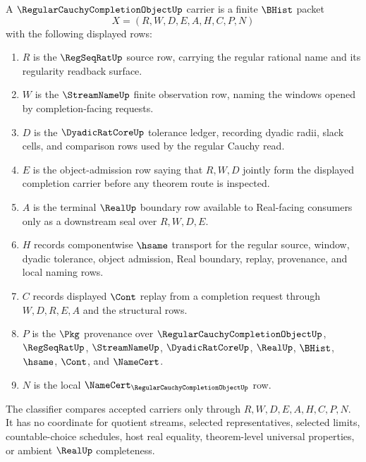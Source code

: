 \begin{definition}
\label{def:regular-cauchy-completion-object-carrier}
A $\RegularCauchyCompletionObjectUp$ carrier is a finite $\BHist$ packet
$$
X=(R,W,D,E,A,H,C,P,N)
$$
with the following displayed rows:
\begin{enumerate}
\item $R$ is the $\RegSeqRatUp$ source row, carrying the regular rational name and its regularity readback surface.
\item $W$ is the $\StreamNameUp$ finite observation row, naming the windows opened by completion-facing requests.
\item $D$ is the $\DyadicRatCoreUp$ tolerance ledger, recording dyadic radii, slack cells, and comparison rows used by the regular Cauchy read.
\item $E$ is the object-admission row saying that $R,W,D$ jointly form the displayed completion carrier before any theorem route is inspected.
\item $A$ is the terminal $\RealUp$ boundary row available to Real-facing consumers only as a downstream seal over $R,W,D,E$.
\item $H$ records componentwise $\hsame$ transport for the regular source, window, dyadic tolerance, object admission, Real boundary, replay, provenance, and local naming rows.
\item $C$ records displayed $\Cont$ replay from a completion request through $W,D,R,E,A$ and the structural rows.
\item $P$ is the $\Pkg$ provenance over $\RegularCauchyCompletionObjectUp$, $\RegSeqRatUp$, $\StreamNameUp$, $\DyadicRatCoreUp$, $\RealUp$, $\BHist$, $\hsame$, $\Cont$, and $\NameCert$.
\item $N$ is the local $\NameCert_{\RegularCauchyCompletionObjectUp}$ row.
\end{enumerate}
The classifier compares accepted carriers only through $R,W,D,E,A,H,C,P,N$. It has no coordinate for quotient streams, selected representatives, selected limits, countable-choice schedules, host real equality, theorem-level universal properties, or ambient $\RealUp$ completeness.
\end{definition}


